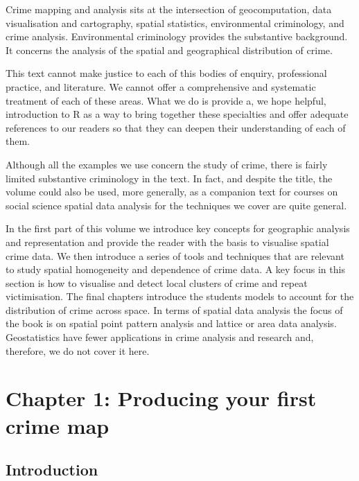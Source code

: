 \documentclass[
]{book}
\begin{document}
Crime mapping and analysis sits at the intersection of geocomputation, data visualisation and cartography, spatial statistics, environmental criminology, and crime analysis. Environmental criminology provides the substantive background. It concerns the analysis of the spatial and geographical distribution of crime.

This text cannot make justice to each of this bodies of enquiry, professional practice, and literature. We cannot offer a comprehensive and systematic treatment of each of these areas. What we do is provide a, we hope helpful, introduction to R as a way to bring together these specialties and offer adequate references to our readers so that they can deepen their understanding of each of them.

Although all the examples we use concern the study of crime, there is fairly limited substantive criminology in the text. In fact, and despite the title, the volume could also be used, more generally, as a companion text for courses on social science spatial data analysis for the techniques we cover are quite general.

In the first part of this volume we introduce key concepts for geographic analysis and representation and provide the reader with the basis to visualise spatial crime data. We then introduce a series of tools and techniques that are relevant to study spatial homogeneity and dependence of crime data. A key focus in this section is how to visualise and detect local clusters of crime and repeat victimisation. The final chapters introduce the students models to account for the distribution of crime across space. In terms of spatial data analysis the focus of the book is on spatial point pattern analysis and lattice or area data analysis. Geostatistics have fewer applications in crime analysis and research and, therefore, we do not cover it here.

\hypertarget{chapter-1-producing-your-first-crime-map}{%
\chapter{Chapter 1: Producing your first crime map}\label{chapter-1-producing-your-first-crime-map}}

\hypertarget{introduction-1}{%
\section{Introduction}\label{introduction-1}}
\end{document}
